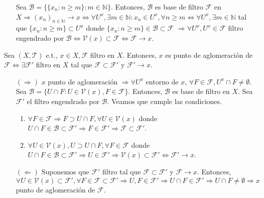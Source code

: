 \begin{dem}
  \begin{enumerate}[label=(\roman*)]
    \item []
    \item [] Sea $\mathcal{B} = \{ \{ x_{n} : n \geq m \} : m \in \mathbb{N} \}$. Entonces, $\mathcal{B}$ es base de filtro $\mathcal{F}$ en $X \Rightarrow ( x_{n} )_{n \in \mathbb{N}} \rightarrow x \Leftrightarrow \forall U^{x}, \exists m \in \mathbb{N} : x_{n} \in U^x, \forall n \geq m \Leftrightarrow \forall U^{x}, \exists m \in \mathbb{N}$ tal que $\{ x_{n} : n \geq m \} \subset U^{x}$ donde $\{ x_{n} : n \geq m \} \in \mathcal{B} \subset \mathcal{F}$ $\Rightarrow \forall U^{x}, U^{x} \in \mathcal{F}$ filtro engendrado por $\mathcal{B} \Leftrightarrow \mathcal{V}(x) \subset \mathcal{F} \Leftrightarrow \mathcal{F} \rightarrow x$.
  \end{enumerate}
\end{dem}

\begin{prop}
  Sea $( X, \mathcal{T} )$ e.t., $x \in X, \mathcal{F}$ filtro en $X$. Entonces, $x$ es punto de aglomeración de $\mathcal{F} \Leftrightarrow \exists \mathcal{F}'$ filtro en $X$ tal que $\mathcal{F} \subset \mathcal{F}'$ y $\mathcal{F}' \rightarrow x$.
\end{prop}

\begin{dem}
  \begin{enumerate}[label=(\roman*)]
    \item []
    \item [$(\Rightarrow)$] $x$ punto de aglomeración $\Rightarrow \forall U^{x}$ entorno de $x$, $\forall F \in \mathcal{F}, U^{x} \cap F \neq \emptyset$. Sea $\mathcal{B} = \{ U \cap F : U \in \mathcal{V}(x), F \in \mathcal{F} \}$. Entonces, $\mathcal{B}$ es base de filtro en $X$. Sea $\mathcal{F}'$ el filtro engendrado por $\mathcal{B}$. Veamos que cumple las condiciones.
      \begin{enumerate}[label=(\roman*)]
        \item $\forall F \in \mathcal{F} \Rightarrow F \supset U \cap F, \forall U \in \mathcal{V}(x)$ donde $U \cap F \in \mathcal{B} \subset \mathcal{F}' \Rightarrow F \in \mathcal{F}' \Rightarrow \mathcal{F} \subset \mathcal{F}'$.
        \item $\forall U \in \mathcal{V}(x), U \supset U \cap F, \forall F \in \mathcal{F}$ donde $U \cap F \in \mathcal{B} \subset \mathcal{F}' \Rightarrow U \in \mathcal{F}' \Rightarrow \mathcal{V}(x) \subset \mathcal{F}' \Leftrightarrow \mathcal{F}' \rightarrow x$.
      \end{enumerate}
    \item [$(\Leftarrow)$] Suponemos que $\mathcal{F}'$ filtro tal que $\mathcal{F} \subset \mathcal{F}'$ y $\mathcal{F} \rightarrow x$. Entonces, $\forall U \in \mathcal{V}(x) \subset \mathcal{F}', \forall F \in \mathcal{F}\subset \mathcal{F}' \Rightarrow U, F \in \mathcal{F}' \Rightarrow U \cap F \in \mathcal{F}' \Rightarrow U \cap F \neq \emptyset \Rightarrow x$ punto de aglomeración de $\mathcal{F}$.
  \end{enumerate}
\end{dem}

